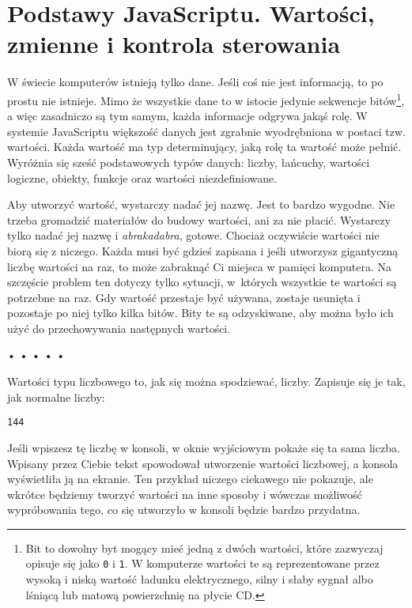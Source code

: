\chapter{Podstawy JavaScriptu. Wartości, zmienne i kontrola sterowania}
\label{chap:2}

W świecie komputerów istnieją tylko dane. Jeśli coś nie jest informacją, to po prostu nie istnieje. Mimo że wszystkie dane to w istocie jedynie sekwencje bitów\footnote{Bit to dowolny byt mogący mieć jedną z dwóch wartości, które zazwyczaj opisuje się jako \texttt{0} i \texttt{1}. W komputerze wartości te są reprezentowane przez wysoką i niską wartość ładunku elektrycznego, silny i słaby sygnał albo lśniącą lub matową powierzchnię na płycie CD.}, a więc zasadniczo są tym samym, każda informacje odgrywa jakąś rolę. W systemie JavaScriptu większość danych jest zgrabnie wyodrębniona w postaci tzw. wartości. Każda wartość ma typ determinujący, jaką rolę ta wartość może pełnić. Wyróżnia się sześć podstawowych typów danych: liczby, łańcuchy, wartości logiczne, obiekty, funkcje oraz wartości niezdefiniowane.

    
Aby utworzyć wartość, wystarczy nadać jej nazwę. Jest to bardzo wygodne. Nie trzeba gromadzić materiałów do budowy wartości, ani za nie płacić. Wystarczy tylko nadać jej nazwę i \emph{abrakadabra}, gotowe. Chociaż oczywiście wartości nie biorą się z niczego. Każda musi być gdzieś zapisana i jeśli utworzysz gigantyczną liczbę wartości na raz, to może zabraknąć Ci miejsca w pamięci komputera. Na szczęście problem ten dotyczy tylko sytuacji, w~których wszystkie te wartości są potrzebne na raz. Gdy wartość przestaje być używana, zostaje usunięta i pozostaje po niej tylko kilka bitów. Bity te są odzyskiwane, aby można było ich użyć do przechowywania następnych wartości.

  
\begin{center}
• • • • •
\end{center} 

Wartości typu liczbowego to, jak się można spodziewać, liczby. Zapisuje się je tak, jak normalne liczby:

\begin{verbatim} 
144
\end{verbatim}
    
Jeśli wpiszesz tę liczbę w konsoli, w oknie wyjściowym pokaże się ta sama liczba. Wpisany przez Ciebie tekst spowodował utworzenie wartości liczbowej, a konsola wyświetliła ją na ekranie. Ten przykład niczego ciekawego nie pokazuje, ale wkrótce będziemy tworzyć wartości na inne sposoby i wówczas możliwość wypróbowania tego, co się utworzyło w konsoli będzie bardzo przydatna.


